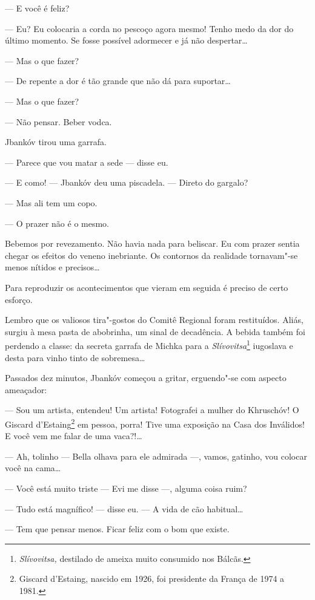 --- E você é feliz?

--- Eu? Eu colocaria a corda no pescoço agora mesmo! Tenho medo \label{ref01}
da dor do último momento. Se fosse possível adormecer e já não
despertar\ldots{}

--- Mas o que fazer?

--- De repente a dor é tão grande que não dá para suportar\ldots{}

--- Mas o que fazer?

--- Não pensar. Beber vodca.

Jbankóv tirou uma garrafa.

--- Parece que vou matar a sede --- disse eu.

--- E como! --- Jbankóv deu uma piscadela. --- Direto do gargalo?

--- Mas ali tem um copo.

--- O prazer não é o mesmo.

Bebemos por revezamento. Não havia nada para beliscar. Eu com prazer
sentia chegar os efeitos do veneno inebriante. Os contornos da realidade
tornavam"-se menos nítidos e precisos\ldots{}

\bigskip

Para reproduzir os acontecimentos que vieram em seguida é preciso de
certo esforço.

Lembro que os valiosos tira"-gostos do Comitê Regional foram restituídos.
Aliás, surgiu à mesa pasta de abobrinha, um sinal de decadência. A
bebida também foi perdendo a classe: da secreta garrafa de Michka para a
\emph{Slívovitsa}\footnote{\emph{Slívovitsa,} destilado de ameixa muito
  consumido nos Bálcãs.} iugoslava e desta para vinho tinto de
sobremesa\ldots{}

Passados dez minutos, Jbankóv começou a gritar, erguendo"-se com aspecto
ameaçador:

--- Sou um artista, entendeu! Um artista! Fotografei a mulher do
Khruschóv! O Giscard d'Estaing\footnote{Giscard d'Estaing, nascido em
  1926, foi presidente da França de 1974 a 1981.} em pessoa, porra! Tive
uma exposição na Casa dos Inválidos! E você vem me falar de uma
vaca?!\ldots{}

--- Ah, tolinho --- Bella olhava para ele admirada
---, vamos, gatinho, vou colocar você na cama\ldots{}

--- Você está muito triste --- Evi me disse ---,
alguma coisa ruim?

--- Tudo está magnífico! --- disse eu. --- A vida
de cão habitual\ldots{}

--- Tem que pensar menos. Ficar feliz com o bom que existe.

